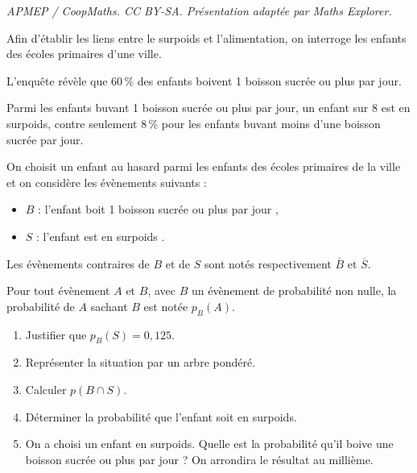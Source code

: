 \documentclass[10pt]{article}
\begin{document}
\noindent\textit{APMEP / CoopMaths. CC BY-SA. Présentation adaptée par Maths Explorer.}\par\medskip
\medskip

Afin d'établir les liens entre le surpoids et l'alimentation, on interroge les enfants des écoles primaires d'une ville.

L'enquête révèle que 60\,\% des enfants boivent 1 boisson sucrée ou plus par jour.

Parmi les enfants buvant 1 boisson sucrée ou plus par jour, un enfant sur 8 est en surpoids, contre seulement 8\,\% pour les enfants buvant moins d'une boisson sucrée par jour.
 
On choisit un enfant au hasard parmi les enfants des écoles primaires de la ville et on considère les évènements suivants :

\begin{itemize}
\item $B$ : \og l'enfant boit 1 boisson sucrée ou plus par jour \fg,
\item $S$ : \og l'enfant est en surpoids \fg.
\end{itemize}

Les évènements contraires de $B$ et de $S$ sont notés respectivement $\overline{B}$ et $\overline{S}$.

Pour tout évènement $A$ et $B$, avec $B$ un évènement de probabilité non nulle, la probabilité de $A$ sachant $B$ est notée $p_B(A)$.

\medskip

\begin{enumerate}
\item Justifier que $p_B(S) = 0,125$.
\item Représenter la situation par un arbre pondéré.
\item Calculer $p(B \cap S)$.
\item Déterminer la probabilité que l'enfant soit en surpoids.
\item On a choisi un enfant en surpoids. Quelle est la probabilité qu'il boive une boisson sucrée ou plus par jour ? On arrondira le résultat au millième.
\end{enumerate}

\vspace{0,5cm}
\end{document}
